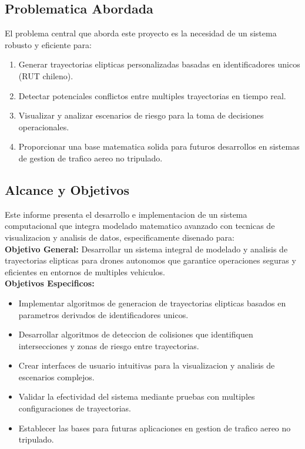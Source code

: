 \documentclass[12pt,a4paper]{article}
\begin{document}
\subsection{Problematica Abordada}

El problema central que aborda este proyecto es la necesidad de un sistema robusto y eficiente para:

\begin{enumerate}
    \item Generar trayectorias elipticas personalizadas basadas en identificadores unicos (RUT chileno).
    \item Detectar potenciales conflictos entre multiples trayectorias en tiempo real.
    \item Visualizar y analizar escenarios de riesgo para la toma de decisiones operacionales.
    \item Proporcionar una base matematica solida para futuros desarrollos en sistemas de gestion de trafico aereo no tripulado.
\end{enumerate}

\subsection{Alcance y Objetivos}

Este informe presenta el desarrollo e implementacion de un sistema computacional que integra modelado matematico avanzado con tecnicas de visualizacion y analisis de datos, especificamente disenado para:\\

\textbf{Objetivo General:}
Desarrollar un sistema integral de modelado y analisis de trayectorias elipticas para drones autonomos que garantice operaciones seguras y eficientes en entornos de multiples vehiculos.\\

\textbf{Objetivos Especificos:}
\begin{itemize}
    \item Implementar algoritmos de generacion de trayectorias elipticas basados en parametros derivados de identificadores unicos.
    \item Desarrollar algoritmos de deteccion de colisiones que identifiquen intersecciones y zonas de riesgo entre trayectorias.
    \item Crear interfaces de usuario intuitivas para la visualizacion y analisis de escenarios complejos.
    \item Validar la efectividad del sistema mediante pruebas con multiples configuraciones de trayectorias.
    \item Establecer las bases para futuras aplicaciones en gestion de trafico aereo no tripulado.
\end{itemize}
\end{document}
